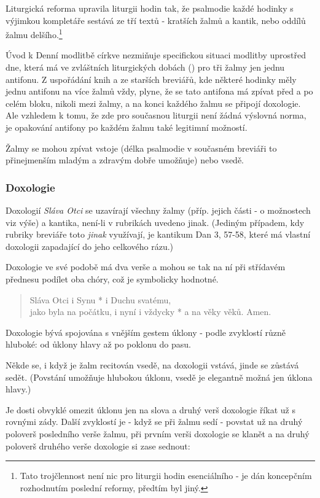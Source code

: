 Liturgická reforma upravila liturgii hodin tak, že psalmodie každé hodinky
s výjimkou kompletáře sestává ze tří textů - kratších žalmů a kantik, nebo
oddílů žalmu delšího.\footnote{Tato trojčlennost není nic pro liturgii hodin
esenciálního - je dán koncepčním rozhodnutím poslední reformy, předtím
byl jiný.}

Úvod k Denní modlitbě církve nezmiňuje specifickou situaci modlitby uprostřed 
dne, která má ve zvláštních liturgických dobách (\emph{})
pro tři žalmy jen jednu antifonu. Z uspořádání knih a ze starších breviářů,
kde některé hodinky měly jednu antifonu na více žalmů vždy, plyne,
že se tato antifona má zpívat před a po celém bloku, nikoli mezi žalmy,
a na konci každého žalmu se připojí doxologie. Ale vzhledem k tomu, že
zde pro současnou liturgii není žádná výslovná norma, je opakování antifony 
po každém žalmu také legitimní možností.

Žalmy se mohou zpívat vstoje (délka psalmodie v současném breviáři to
přinejmenším mladým a zdravým dobře umožňuje) nebo vsedě.

\subsubsection{Doxologie}

Doxologií \emph{Sláva Otci} se uzavírají všechny žalmy (příp. jejich části -
o možnostech viz výše) a kantika, není-li v rubrikách uvedeno jinak. 
(Jediným případem, kdy rubriky breviáře toto \emph{jinak} využívají,
je kantikum Dan 3, 57-58, které má vlastní doxologii
zapadající do jeho celkového rázu.)

Doxologie ve své  podobě má dva verše a mohou se tak na ní
při střídavém přednesu podílet oba chóry, což je symbolicky hodnotné.

\begin{quote}
Sláva Otci i Synu * i Duchu svatému,\\
jako byla na počátku, i nyní i vždycky * a na věky věků. Amen.
\end{quote}

Doxologie bývá spojována s vnějším gestem úklony - podle zvyklostí různě 
hluboké: od ůklony hlavy až po poklonu do pasu.

Někde se, i když je žalm recitován vsedě, na doxologii vstává,
jinde se zůstává sedět. (Povstání umožňuje hlubokou úklonu, vsedě je
elegantně možná jen úklona hlavy.)

Je dosti obvyklé omezit úklonu jen na slova 
 a druhý verš doxologie říkat už
s rovnými zády.
Další zvyklostí je - když se při žalmu sedí - povstat už na druhý poloverš 
posledního verše žalmu, při prvním verši doxologie se klanět
a na druhý poloverš druhého verše doxologie si zase sednout:

